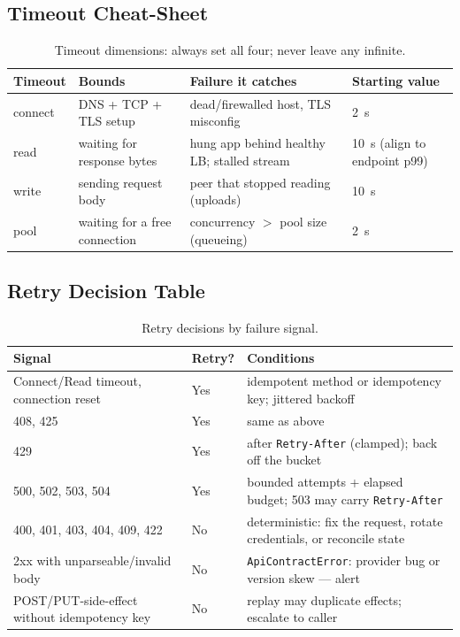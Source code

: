 \subsection{Timeout Cheat-Sheet}

\begin{table}[h]
  \centering
  \small
  \begin{tabularx}{\textwidth}{l l X l}
    \toprule
    \textbf{Timeout} & \textbf{Bounds} & \textbf{Failure it catches} & \textbf{Starting value} \\
    \midrule
    connect & DNS + TCP + TLS setup & dead/firewalled host, TLS misconfig & 2~s \\
    read    & waiting for response bytes & hung app behind healthy LB; stalled stream & 10~s (align to endpoint p99) \\
    write   & sending request body & peer that stopped reading (uploads) & 10~s \\
    pool    & waiting for a free connection & concurrency $>$ pool size (queueing) & 2~s \\
    \bottomrule
  \end{tabularx}
  \caption{Timeout dimensions: always set all four; never leave any infinite.}
  \label{tab:ch02-timeout-cheatsheet}
\end{table}

\subsection{Retry Decision Table}

\begin{table}[h]
  \centering
  \small
  \begin{tabularx}{\textwidth}{l l X}
    \toprule
    \textbf{Signal} & \textbf{Retry?} & \textbf{Conditions} \\
    \midrule
    Connect/Read timeout, connection reset & Yes & idempotent method or idempotency key; jittered backoff \\
    408, 425 & Yes & same as above \\
    429 & Yes & after \texttt{Retry-After} (clamped); back off the bucket \\
    500, 502, 503, 504 & Yes & bounded attempts + elapsed budget; 503 may carry \texttt{Retry-After} \cite{rfc9110} \\
    400, 401, 403, 404, 409, 422 & No & deterministic: fix the request, rotate credentials, or reconcile state \\
    2xx with unparseable/invalid body & No & \texttt{ApiContractError}: provider bug or version skew --- alert \\
    POST/PUT-side-effect without idempotency key & No & replay may duplicate effects; escalate to caller \\
    \bottomrule
  \end{tabularx}
  \caption{Retry decisions by failure signal.}
  \label{tab:ch02-retry-decisions}
\end{table}

